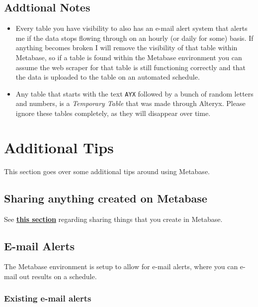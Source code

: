 \documentclass[
]{book}
\begin{document}
\hypertarget{addtional-notes}{%
\section{Addtional Notes}\label{addtional-notes}}

\begin{itemize}
\item
  Every table you have visibility to also has an e-mail alert system that alerts me if the data stops flowing through on an hourly (or daily for some) basis. If anything becomes broken I will remove the visibility of that table within Metabase, so if a table is found within the Metabase environment you can assume the web scraper for that table is still functioning correctly and that the data is uploaded to the table on an automated schedule.
\item
  Any table that starts with the text \texttt{AYX} followed by a bunch of random letters and numbers, is a \emph{Temporary Table} that was made through Alteryx. Please ignore these tables completely, as they will disappear over time.
\end{itemize}

\hypertarget{additional-tips}{%
\chapter{Additional Tips}\label{additional-tips}}

This section goes over some additional tips around using Metabase.

\hypertarget{sharing-anything-created-on-metabase}{%
\section{Sharing anything created on Metabase}\label{sharing-anything-created-on-metabase}}

See \protect\hyperlink{sharing}{\textbf{this section}} regarding sharing things that you create in Metabase.

\hypertarget{e-mail-alerts}{%
\section{E-mail Alerts}\label{e-mail-alerts}}

The Metabase environment is setup to allow for e-mail alerts, where you can e-mail out results on a schedule.

\hypertarget{existing-e-mail-alerts}{%
\subsection{Existing e-mail alerts}\label{existing-e-mail-alerts}}
\end{document}
